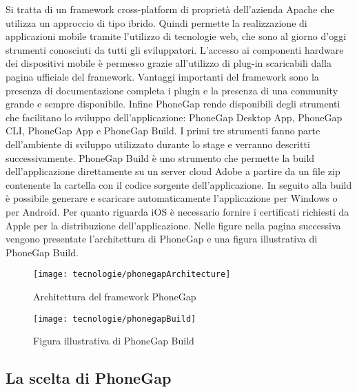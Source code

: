 Si tratta di un framework cross-platform di proprietà dell'azienda Apache che utilizza un approccio di tipo ibrido. Quindi permette la realizzazione di applicazioni mobile tramite l'utilizzo di tecnologie web, che sono al giorno d'oggi strumenti conosciuti da tutti gli sviluppatori. L'accesso ai componenti hardware dei dispositivi mobile è permesso grazie all'utilizzo di plug-in scaricabili dalla pagina ufficiale del framework. Vantaggi importanti del framework sono la presenza di documentazione completa i plugin e la presenza di una community grande e sempre disponibile. Infine PhoneGap rende disponibili degli strumenti che facilitano lo sviluppo dell'applicazione: PhoneGap Desktop App, PhoneGap CLI, PhoneGap App e PhoneGap Build. I primi tre strumenti fanno parte dell'ambiente di sviluppo utilizzato durante lo stage e verranno descritti successivamente. PhoneGap Build è uno strumento che permette la build dell'applicazione direttamente su un server cloud Adobe a partire da un file zip contenente la cartella con il codice sorgente dell'applicazione. In seguito alla build è possibile generare e scaricare automaticamente l'applicazione per Windows o per Android. Per quanto riguarda iOS è necessario fornire i certificati richiesti da Apple per la distribuzione dell'applicazione. Nelle figure nella pagina successiva vengono presentate l'architettura di PhoneGap e una figura illustrativa di PhoneGap Build.

\begin{figure}[!h] 
    \centering 
    \texttt{[image: tecnologie/phonegapArchitecture]} 
    \caption{Architettura del framework PhoneGap}
\end{figure}

\begin{figure}[!h] 
    \centering 
    \texttt{[image: tecnologie/phonegapBuild]} 
    \caption{Figura illustrativa di PhoneGap Build}
\end{figure}

\newpage


\subsection{La scelta di PhoneGap}


